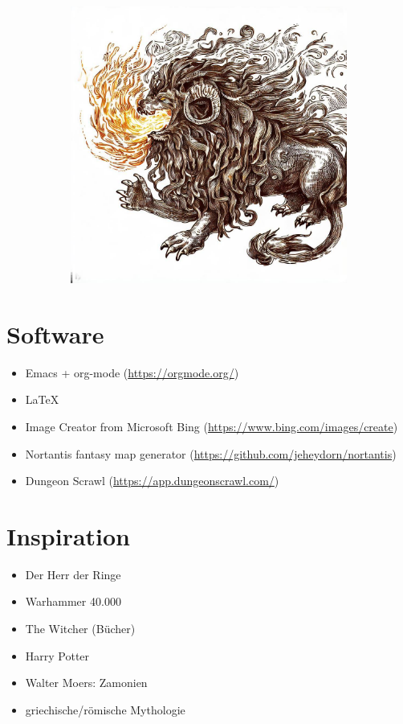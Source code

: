\documentclass[11pt, twoside]{article}
\begin{document}
\begin{figure}[H]
\begin{subfigure}{0.3\textwidth}
  \end{subfigure}%
  \begin{subfigure}{0.3\textwidth}
    \centering
    \includegraphics[width=0.99\linewidth]{chim3.jpeg}
  \end{subfigure}
\end{figure}

\newpage
\appendix
\listoffigures
\newpage

\section{Software}
\label{sec:org0494932}
\begin{itemize}
\item Emacs + org-mode (\href{https://orgmode.org/}{https://orgmode.org/})
\item \LaTeX
\item Image Creator from Microsoft Bing (\href{https://www.bing.com/images/create}{https://www.bing.com/images/create})
\item Nortantis fantasy map generator (\href{https://github.com/jeheydorn/nortantis}{https://github.com/jeheydorn/nortantis})
\item Dungeon Scrawl (\href{https://app.dungeonscrawl.com/}{https://app.dungeonscrawl.com/})
\end{itemize}

\section{Inspiration}
\label{sec:orgc402ebd}
\begin{itemize}
\item Der Herr der Ringe
\item Warhammer 40.000
\item The Witcher (Bücher)
\item Harry Potter
\item Walter Moers: Zamonien
\item griechische/römische Mythologie
\end{itemize}
\end{document}
